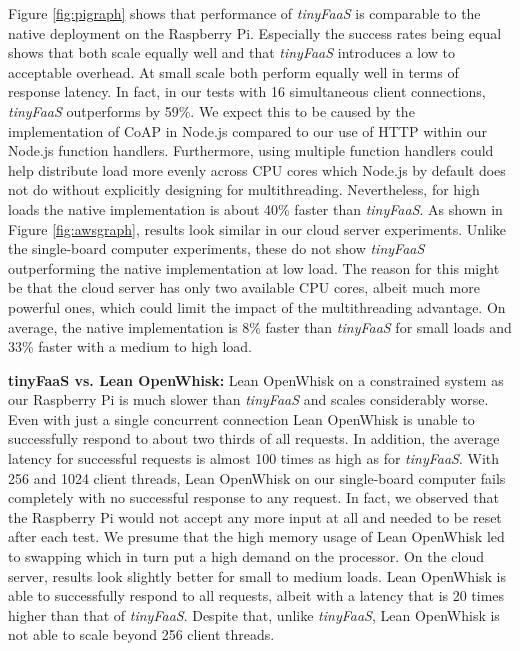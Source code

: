 Figure \ref{fig:pigraph} shows that performance of \textit{tinyFaaS} is comparable to the native deployment on the Raspberry Pi.
Especially the success rates being equal shows that both scale equally well and that \textit{tinyFaaS} introduces a low to acceptable overhead.
At small scale both perform equally well in terms of response latency.
In fact, in our tests with 16 simultaneous client connections, \textit{tinyFaaS} outperforms by 59\%.
We expect this to be caused by the implementation of CoAP in Node.js compared to our use of HTTP within our Node.js function handlers.
Furthermore, using multiple function handlers could help distribute load more evenly across CPU cores which Node.js by default does not do without explicitly designing for multithreading.
Nevertheless, for high loads the native implementation is about 40\% faster than \textit{tinyFaaS}.
As shown in Figure \ref{fig:awsgraph}, results look similar in our cloud server experiments.
Unlike the single-board computer experiments, these do not show \textit{tinyFaaS} outperforming the native implementation at low load.
The reason for this might be that the cloud server has only two available CPU cores, albeit much more powerful ones, which could limit the impact of the multithreading advantage.
On average, the native implementation is 8\% faster than \textit{tinyFaaS} for small loads and 33\% faster with a medium to high load.

\textbf{tinyFaaS vs. Lean OpenWhisk:} Lean OpenWhisk on a constrained system as our Raspberry Pi is much slower than \textit{tinyFaaS} and scales considerably worse.
Even with just a single concurrent connection Lean OpenWhisk is unable to successfully respond to about two thirds of all requests.
In addition, the average latency for successful requests is almost 100 times as high as for \textit{tinyFaaS}.
With 256 and 1024 client threads, Lean OpenWhisk on our single-board computer fails completely with no successful response to any request.
In fact, we observed that the Raspberry Pi would not accept any more input at all and needed to be reset after each test.
We presume that the high memory usage of Lean OpenWhisk led to swapping which in turn put a high demand on the processor.
On the cloud server, results look slightly better for small to medium loads.
Lean OpenWhisk is able to successfully respond to all requests, albeit with a latency that is 20 times higher than that of \textit{tinyFaaS}.
Despite that, unlike \textit{tinyFaaS}, Lean OpenWhisk is not able to scale beyond 256 client threads.

